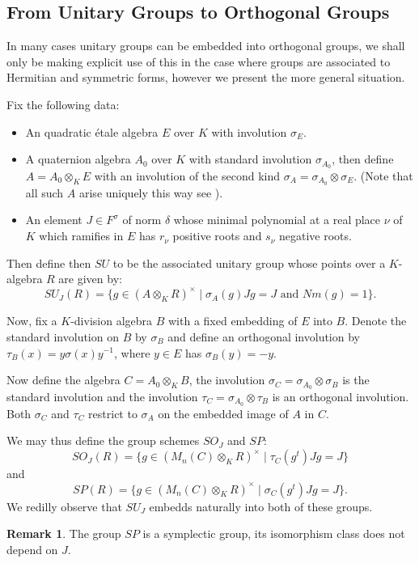 \documentclass{article}
\theoremstyle{plain}
\theoremstyle{definition}
\newtheorem{remark}[theorem]{Remark}
\begin{document}
\subsection{From Unitary Groups to Orthogonal Groups}

In many cases unitary groups can be embedded into orthogonal groups, we shall only be making explicit use of this in the case where groups are associated to Hermitian and symmetric forms, however we present the more general situation.

Fix the following data:
\begin{itemize}
\item An quadratic \'etale algebra $E$ over $K$ with involution $\sigma_E$.
\item A quaternion algebra $A_0$ over $K$ with standard involution $\sigma_{A_0}$, then define $A = A_0\otimes_K E$ with an involution of the second kind $\sigma_A = \sigma_{A_0} \otimes \sigma_E$.
(Note that all such $A$ arise uniquely this way see \cite[2.22]{TODO - book of involutions}).
\item An element $J\in F^\sigma$ of norm $\delta$ whose minimal polynomial at a real place $\nu$ of $K$ which ramifies in $E$ has $r_\nu$ positive roots and $s_\nu$ negative roots.
\end{itemize}
Then define then $SU$ to be the associated unitary group whose points over a $K$-algebra $R$ are given by:
\[ SU_J(R) = \{ g\in (A\otimes_K R)^\times \mid \sigma_A(g)Jg = J \text{ and } Nm(g) = 1 \}. \]

Now, fix a $K$-division algebra $B$ with a fixed embedding of $E$ into $B$. Denote the standard involution on $B$ by $\sigma_{B}$ and define an orthogonal involution by $\tau_B(x) = y\sigma(x)y^{-1}$, where $y\in E$ has $\sigma_B(y) = -y$.

Now define the algebra $C = A_0 \otimes_K B$, the involution $\sigma_C = \sigma_{A_0} \otimes \sigma_B$ is the standard involution and the involution $\tau_C = \sigma_{A_0} \otimes \tau_B$ is an orthogonal involution.
Both $\sigma_C$ and $\tau_C$ restrict to $\sigma_A$ on the embedded image of $A$ in $C$.

We may thus define the group schemes $SO_J$ and $SP$:
\[ SO_J(R) =  \{ g\in (M_{n}(C) \otimes_K R)^\times \mid \tau_C(g^t)Jg = J  \} \]
and
\[ SP(R) =  \{ g\in (M_{n}(C) \otimes_K R)^\times \mid \sigma_C(g^t)Jg = J  \}. \]
We redilly observe that $SU_J$ embedds naturally into both of these groups.
\begin{remark}
The group $SP$ is a symplectic group, its isomorphism class does not depend on $J$.
\end{remark}
\end{document}
